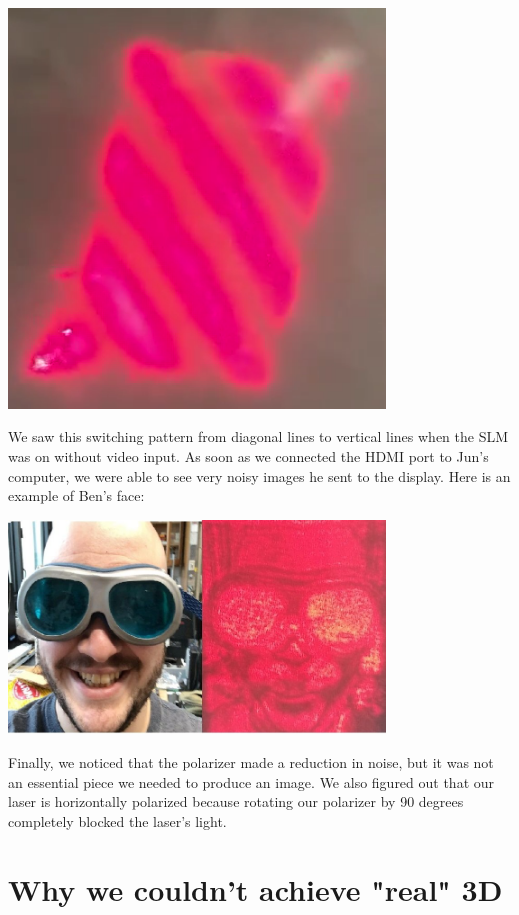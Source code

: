 \documentclass[12pt]{article}
\begin{document}
\begin{center}
\includegraphics[width=100mm]{initHologram.png}
\end{center}

We saw this switching pattern from diagonal lines to vertical lines when the SLM was on without video input. As soon as we connected the HDMI port to Jun's computer, we were able to see very noisy images he sent to the display. Here is an example of Ben's face:

\begin{center}
\includegraphics[width=100mm]{noisy_hologram.jpg}
\end{center}

Finally, we noticed that the polarizer made a reduction in noise, but it was not an essential piece we needed to produce an image. We also figured out that our laser is horizontally polarized because rotating our polarizer by 90 degrees completely blocked the laser's light.

\section{Why we couldn't achieve "real" 3D}
\end{document}
